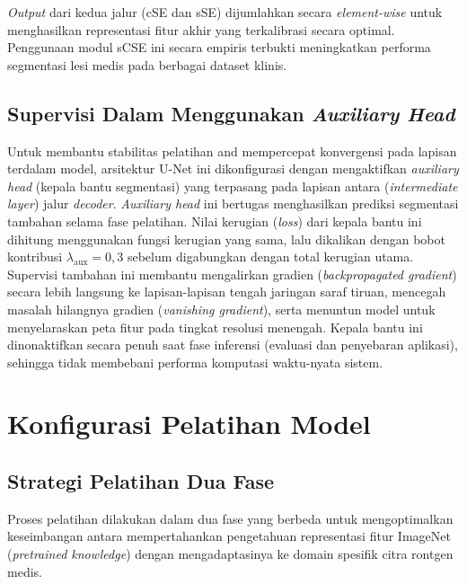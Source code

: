 \documentclass[12pt,a4paper,oneside]{book}
\begin{document}
\textit{Output} dari kedua jalur (cSE dan sSE) dijumlahkan secara \textit{element-wise} untuk menghasilkan representasi fitur akhir yang terkalibrasi secara optimal. Penggunaan modul sCSE ini secara empiris terbukti meningkatkan performa segmentasi lesi medis pada berbagai dataset klinis.

\subsection{Supervisi Dalam Menggunakan \textit{Auxiliary Head}}

Untuk membantu stabilitas pelatihan and mempercepat konvergensi pada lapisan terdalam model, arsitektur U-Net ini dikonfigurasi dengan mengaktifkan \textit{auxiliary head} (kepala bantu segmentasi) yang terpasang pada lapisan antara (\textit{intermediate layer}) jalur \textit{decoder}. \textit{Auxiliary head} ini bertugas menghasilkan prediksi segmentasi tambahan selama fase pelatihan. Nilai kerugian (\textit{loss}) dari kepala bantu ini dihitung menggunakan fungsi kerugian yang sama, lalu dikalikan dengan bobot kontribusi $\lambda_{\text{aux}} = 0,3$ sebelum digabungkan dengan total kerugian utama. Supervisi tambahan ini membantu mengalirkan gradien (\textit{backpropagated gradient}) secara lebih langsung ke lapisan-lapisan tengah jaringan saraf tiruan, mencegah masalah hilangnya gradien (\textit{vanishing gradient}), serta menuntun model untuk menyelaraskan peta fitur pada tingkat resolusi menengah. Kepala bantu ini dinonaktifkan secara penuh saat fase inferensi (evaluasi dan penyebaran aplikasi), sehingga tidak membebani performa komputasi waktu-nyata sistem.

\section{Konfigurasi Pelatihan Model}

\subsection{Strategi Pelatihan Dua Fase}

Proses pelatihan dilakukan dalam dua fase yang berbeda untuk mengoptimalkan keseimbangan antara mempertahankan pengetahuan representasi fitur ImageNet (\textit{pretrained knowledge}) dengan mengadaptasinya ke domain spesifik citra rontgen medis.
\end{document}
